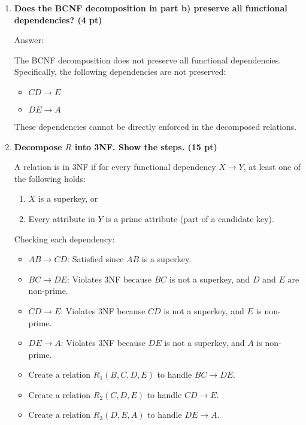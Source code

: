 \documentclass[12pt]{article}
\begin{document}
\begin{enumerate}
	\item \textbf{Does the BCNF decomposition in part b) preserve all functional dependencies? (4 pt)}
	
Answer:

	The BCNF decomposition does not preserve all functional dependencies. Specifically, the following dependencies are not preserved:
	\begin{itemize}
		\item \( CD \rightarrow E \)
		\item \( DE \rightarrow A \)
	\end{itemize}
	
	These dependencies cannot be directly enforced in the decomposed relations.
	
	\item \textbf{Decompose \( R \) into 3NF. Show the steps. (15 pt)}
	
	A relation is in 3NF if for every functional dependency \( X \rightarrow Y \), at least one of the following holds:
	\begin{enumerate}
		\item \( X \) is a superkey, or
		\item Every attribute in \( Y \) is a prime attribute (part of a candidate key).
	\end{enumerate}
	
	Checking each dependency:
	\begin{itemize}
		\item \( AB \rightarrow CD \): Satisfied since \( AB \) is a superkey.
		\item \( BC \rightarrow DE \): Violates 3NF because \( BC \) is not a superkey, and \( D \) and \( E \) are non-prime.
		\item \( CD \rightarrow E \): Violates 3NF because \( CD \) is not a superkey, and \( E \) is non-prime.
		\item \( DE \rightarrow A \): Violates 3NF because \( DE \) is not a superkey, and \( A \) is non-prime.
	\end{itemize}

	\begin{itemize}
		\item Create a relation \( R_1(B, C, D, E) \) to handle \( BC \rightarrow DE \).
		\item Create a relation \( R_2(C, D, E) \) to handle \( CD \rightarrow E \).
		\item Create a relation \( R_3(D, E, A) \) to handle \( DE \rightarrow A \).
	\end{itemize}
	

\end{enumerate}
\end{document}
